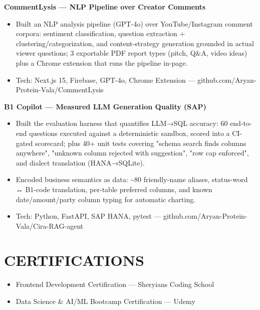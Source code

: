 \documentclass[9pt]{article}
\begin{document}
\textbf{CommentLysis  ---  NLP Pipeline over Creator Comments}
\vspace{1pt}
\begin{itemize}[leftmargin=11pt,itemsep=0pt,topsep=1pt,parsep=0pt]
\item Built an NLP analysis pipeline (GPT-4o) over YouTube/Instagram comment corpora: sentiment classification, question extraction + clustering/categorization, and content-strategy generation grounded in actual viewer questions; 3 exportable PDF report types (pitch, Q\&A, video ideas) plus a Chrome extension that runs the pipeline in-page.
\item Tech: Next.js 15, Firebase, GPT-4o, Chrome Extension  ---  github.com/Aryan-Protein-Vala/CommentLysis
\end{itemize}
\textbf{B1 Copilot  ---  Measured LLM Generation Quality (SAP)}
\vspace{1pt}
\begin{itemize}[leftmargin=11pt,itemsep=0pt,topsep=1pt,parsep=0pt]
\item Built the evaluation harness that quantifies LLM→SQL accuracy: 60 end-to-end questions executed against a deterministic sandbox, scored into a CI-gated scorecard; plus 40+ unit tests covering "schema search finds columns anywhere", "unknown column rejected with suggestion", "row cap enforced", and dialect translation (HANA→SQLite).
\item Encoded business semantics as data: \textasciitilde{}80 friendly-name aliases, status-word ↔ B1-code translation, per-table preferred columns, and known date/amount/party column typing for automatic charting.
\item Tech: Python, FastAPI, SAP HANA, pytest  ---  github.com/Aryan-Protein-Vala/Cira-RAG-agent
\end{itemize}
\section*{CERTIFICATIONS}
\begin{itemize}[leftmargin=11pt,itemsep=0pt,topsep=1pt,parsep=0pt]
\item Frontend Development Certification  ---  Sheryians Coding School
\item Data Science \& AI/ML Bootcamp Certification  ---  Udemy
\end{itemize}
\end{document}
